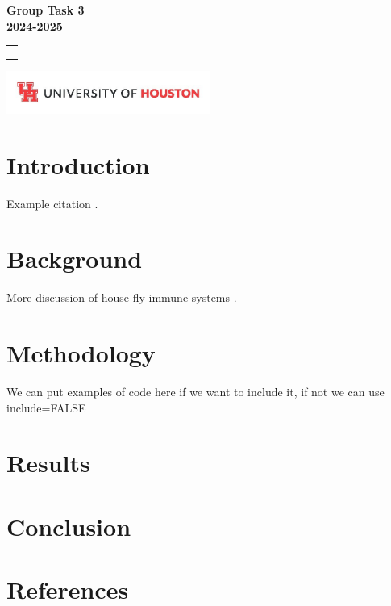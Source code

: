 \documentclass{report}
\begin{document}
\begin{titlepage}
    \centering
    \vspace*{5cm}
    {\Huge \textbf{Group Task 3\\[0.5em] 2024-2025}} \\[1.5em]
    \begin{tabular}{c}
        {\Large } \\
    {\large } \\
     \\[1em]
        \end{tabular}
    \vfill
    \includegraphics[width=0.5\textwidth]{UHLogo_Long.png}
    \vspace{0.8cm}
\end{titlepage}

\newpage

\section{Introduction}\label{introduction}

Example citation \autocite{asgari2022}.

\newpage

\section{Background}\label{background}

More discussion of house fly immune systems \autocite{asgari2022}.

\newpage

\section{Methodology}\label{methodology}

We can put examples of code here if we want to include it, if not we can
use include=FALSE

\newpage

\section{Results}\label{results}

\newpage

\section{Conclusion}\label{conclusion}

\newpage

\section*{References}\label{references}

\printbibliography[heading=none]
\end{document}
